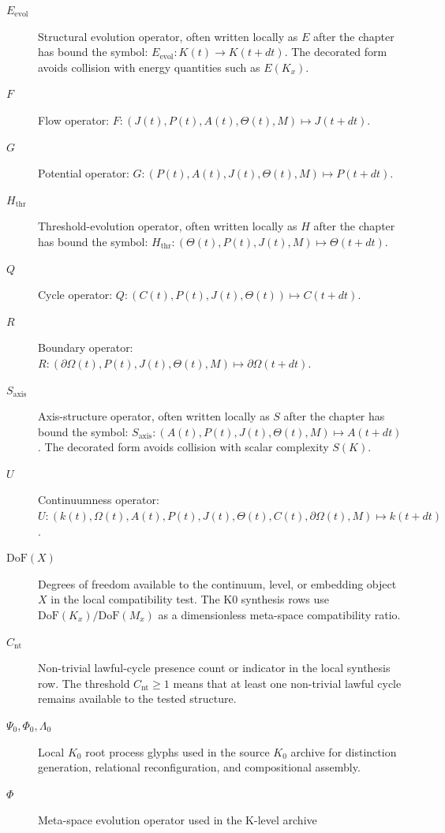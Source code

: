 \begin{description}
  \item[\(E_{\mathrm{evol}}\)] Structural evolution operator, often written
        locally as \(E\) after the chapter has bound the symbol:
        \(E_{\mathrm{evol}}: K(t) \to K(t+dt)\). The decorated form avoids
        collision with energy quantities such as \(E(K_x)\).
  \item[\(F\)] Flow operator:
        \(F:(J(t),P(t),A(t),\Theta(t),M)\mapsto J(t+dt)\).
  \item[\(G\)] Potential operator:
        \(G:(P(t),A(t),J(t),\Theta(t),M)\mapsto P(t+dt)\).
  \item[\(H_{\mathrm{thr}}\)] Threshold-evolution operator, often written
        locally as \(H\) after the chapter has bound the symbol:
        \(H_{\mathrm{thr}}:(\Theta(t),P(t),J(t),M)\mapsto \Theta(t+dt)\).
  \item[\(Q\)] Cycle operator:
        \(Q:(C(t),P(t),J(t),\Theta(t))\mapsto C(t+dt)\).
  \item[\(R\)] Boundary operator:
        \(R:(\partial\Omega(t),P(t),J(t),\Theta(t),M)\mapsto
        \partial\Omega(t+dt)\).
  \item[\(S_{\mathrm{axis}}\)] Axis-structure operator, often written locally
        as \(S\) after the chapter has bound the symbol:
        \(S_{\mathrm{axis}}:(A(t),P(t),J(t),\Theta(t),M)\mapsto A(t+dt)\).
        The decorated form avoids collision with scalar complexity \(S(K)\).
  \item[\(U\)] Continuumness operator:
        \(U:(k(t),\Omega(t),A(t),P(t),J(t),\Theta(t),C(t),
        \partial\Omega(t),M)\mapsto k(t+dt)\).
  \item[\(\mathrm{DoF}(X)\)] Degrees of freedom available to the continuum,
        level, or embedding object \(X\) in the local compatibility test.
        The K0 synthesis rows use \(\mathrm{DoF}(K_x)/\mathrm{DoF}(M_x)\)
        as a dimensionless meta-space compatibility ratio.
  \item[\(C_{\mathrm{nt}}\)] Non-trivial lawful-cycle presence count or
        indicator in the local synthesis row. The threshold
        \(C_{\mathrm{nt}}\geq 1\) means that at least one non-trivial lawful
        cycle remains available to the tested structure.
  \item[\(\Psi_0,\Phi_0,\Lambda_0\)] Local \(K_0\) root process glyphs used in
        the source \(K_0\) archive for distinction generation, relational
        reconfiguration, and compositional assembly.
  \item[\(\Phi\)] Meta-space evolution operator used in the K-level archive

\end{description}
